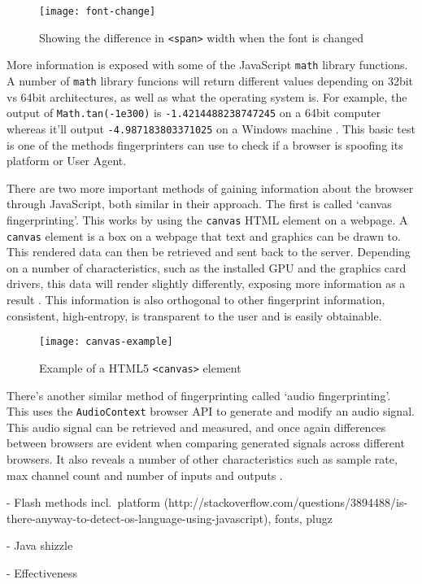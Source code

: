 \begin{figure}[h]
\caption{Showing the difference in \texttt{<span>} width when the font is changed}
\texttt{[image: font-change]}
\centering
\label{fig:font-change}
\end{figure}

More information is exposed with some of the JavaScript \texttt{math} library functions.
A number of \texttt{math} library funcions will return different values depending on 32bit vs 64bit architectures, as well as what the operating system is.
For example, the output of \texttt{Math.tan(-1e300)} is \texttt{-1.4214488238747245} on a 64bit computer whereas it'll output \texttt{-4.987183803371025} on a Windows machine \citep{browserprint-math}.
This basic test is one of the methods fingerprinters can use to check if a browser is spoofing its platform or User Agent.

There are two more important methods of gaining information about the browser through JavaScript, both similar in their approach.
The first is called `canvas fingerprinting'.
This works by using the \texttt{canvas} HTML element on a webpage.
A \texttt{canvas} element is a box on a webpage that text and graphics can be drawn to.
This rendered data can then be retrieved and sent back to the server.
Depending on a number of characteristics, such as the installed GPU and the graphics card drivers, this data will render slightly differently, exposing more information as a result \citep{canvas-fingerprint}.
This information is also orthogonal to other fingerprint information, consistent, high-entropy, is transparent to the user and is easily obtainable.

\begin{figure}[h]
\caption{Example of a HTML5 \texttt{<canvas>} element}
\texttt{[image: canvas-example]}
\centering
\label{fig:canvas-example}
\end{figure}

There's another similar method of fingerprinting called `audio fingerprinting'.
This uses the \texttt{AudioContext} browser API to generate and modify an audio signal.
This audio signal can be retrieved and measured, and once again differences between browsers are evident when comparing generated signals across different browsers.
It also reveals a number of other characteristics such as sample rate, max channel count and number of inputs and outputs \citep{audio-fingerprint}.

- Flash methods incl.\ platform (http://stackoverflow.com/questions/3894488/is-there-anyway-to-detect-os-language-using-javascript), fonts, plugz

- Java shizzle

- Effectiveness
